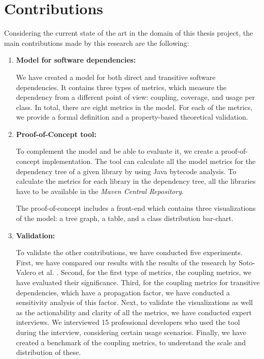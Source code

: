 \section{Contributions}
Considering the current state of the art in the domain of this thesis project, the main contributions made by this research are the following:

\begin{enumerate}
  \item \textbf{Model for software dependencies:}

    We have created a model for both direct and transitive software dependencies. It contains three types of metrics, which measure the dependency from a different point of view: coupling, coverage, and usage per class. In total, there are eight metrics in the model. For each of the metrics, we provide a formal definition and a property-based theoretical validation.

  	\item \textbf{Proof-of-Concept tool:}

    To complement the model and be able to evaluate it, we create a proof-of-concept implementation. The tool can calculate all the model metrics for the dependency tree of a given library by using Java bytecode analysis. To calculate the metrics for each library in the dependency tree, all the libraries have to be available in the \textit{Maven Central Repository}.

    The proof-of-concept includes a front-end which contains three visualizations of the model: a tree graph, a table, and a class distribution bar-chart.

    \item \textbf{Validation:}

    To validate the other contributions, we have conducted five experiments. First, we have compared our results with the results of the research by Soto-Valero et al. \cite{soto2020comprehensive}. Second, for the first type of metrics, the coupling metrics, we have evaluated their significance. Third, for the coupling metrics for transitive dependencies, which have a propagation factor, we have conducted a sensitivity analysis of this factor. Next, to validate the visualizations as well as the actionability and clarity of all the metrics, we have conducted expert interviews. We interviewed 15 professional developers who used the tool during the interview, considering certain usage scenarios. Finally, we have created a benchmark of the coupling metrics, to understand the scale and distribution of these.

\end{enumerate}


